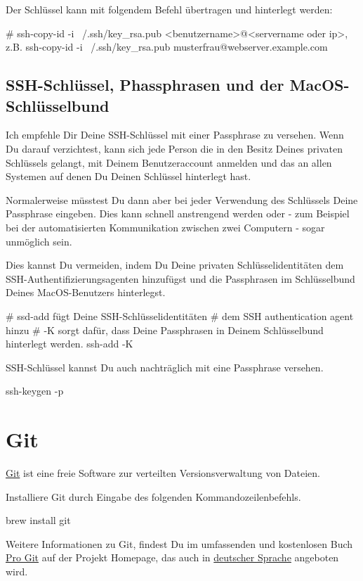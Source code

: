 \documentclass[]{article}
\begin{document}
Der Schlüssel kann mit folgendem Befehl übertragen und hinterlegt werden:
\begin{bashcode}
# ssh-copy-id -i ~/.ssh/key_rsa.pub <benutzername>@<servername oder ip>, z.B.
ssh-copy-id -i ~/.ssh/key_rsa.pub musterfrau@webserver.example.com
\end{bashcode}

\subsection{SSH-Schlüssel, Phassphrasen und der MacOS-Schlüsselbund}
Ich empfehle Dir Deine SSH-Schlüssel mit einer Passphrase zu versehen. Wenn Du darauf verzichtest, kann sich jede Person die in den Besitz Deines privaten Schlüssels gelangt, mit Deinem Benutzeraccount anmelden und das an allen Systemen auf denen Du Deinen Schlüssel hinterlegt hast.

Normalerweise müsstest Du dann aber bei jeder Verwendung des Schlüssels Deine Passphrase eingeben. Dies kann schnell anstrengend werden oder - zum Beispiel bei der automatisierten Kommunikation zwischen zwei Computern - sogar unmöglich sein.

Dies kannst Du vermeiden, indem Du Deine privaten Schlüsselidentitäten dem SSH-Authentifizierungsagenten hinzufügst und die Passphrasen im Schlüsselbund Deines MacOS-Benutzers hinterlegst. 

\begin{bashcode}
# ssd-add fügt Deine SSH-Schlüsselidentitäten
# dem SSH authentication agent hinzu
# -K sorgt dafür, dass Deine Passphrasen in Deinem Schlüsselbund hinterlegt werden.
ssh-add -K
\end{bashcode}

SSH-Schlüssel kannst Du auch nachträglich mit eine Passphrase versehen.
\begin{bashcode}
ssh-keygen -p
\end{bashcode}

\section{Git}
\href{https://git-scm.com/}{Git} ist eine freie Software zur verteilten Versionsverwaltung von Dateien.

Installiere Git durch Eingabe des folgenden Kommandozeilenbefehls.
\begin{bashcode}
brew install git
\end{bashcode}

Weitere Informationen zu Git, findest Du im umfassenden und kostenlosen Buch \href{https://git-scm.com/book/en/v2}{Pro Git} auf der Projekt Homepage, das auch in \href{https://git-scm.com/book/de/v2/}{deutscher Sprache} angeboten wird.
\end{document}
